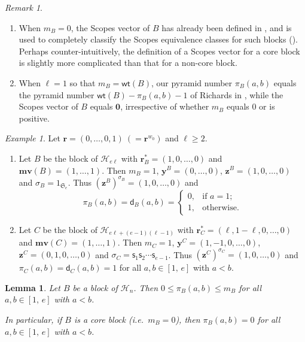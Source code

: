 \documentclass[11pt,a4paper,reqno]{amsart}
\numberwithin{equation}{section}
\theoremstyle{plain}
\newtheorem{lem}[thm]{Lemma}
\theoremstyle{definition}
\theoremstyle{remark}
\newtheorem{rem}[thm]{Remark}
\newtheorem{eg}[thm]{Example}
\numberwithin{equation}{section}
\newcommand{\br}{\mathbf{r}}
\newcommand{\by}{\mathbf{y}}
\newcommand{\bz}{\mathbf{z}}
\newcommand{\wt}{\mathsf{wt}}
\newcommand{\mv}{\mathbf{mv}}
\newcommand{\cs}{\mathsf{s}}
\newcommand{\HH}{\mathcal{H}}
\newcommand{\sym}[1]{\mathfrak{S}_{#1}}
\newcommand{\dd}{\mathsf{d}}
\begin{document}
\begin{rem} \hfill
\begin{enumerate}
\item When $m_B = 0$, the Scopes vector of $B$ has already been defined in \cite[Definition 4.14]{LQT}, and is used to completely classify the Scopes equivalence classes for such blocks (\cite[Theorem 4.24]{LQT}).
Perhaps counter-intuitively, the definition of a Scopes vector for a core block is slightly more complicated than that for a non-core block.

\item When $\ell = 1$ so that $m_B = \wt(B)$, our pyramid number $\pi_B(a,b)$ equals the pyramid number $\wt(B)-\pi_B(a,b)-1$ of Richards in \cite{R}, while the Scopes vector of $B$ equals $\textbf{0}$, irrespective of whether $m_B$ equals 0 or is positive.
\end{enumerate}
\end{rem}

\begin{eg}
Let $\br = (0,\dotsc, 0 , 1)\ (= \br^{w_0})$ and $\ell \geq 2$.
\begin{enumerate}
\item
Let $B$ be the block of $\HH_{e\ell}$ with $\br^*_B = (1,0,\dotsc, 0)$ and $\mv(B) = (1,\dotsc, 1)$.
Then $m_B =1$, $\by^B = (0,\dotsc, 0)$, $\bz^B = (1,0,\dotsc,0)$ and $\sigma_B = 1_{\sym{e}}$.
Thus $(\bz^B)^{\sigma_B} = (1,0,\dotsc, 0)$ and
$$
\pi_B(a,b) = \dd_B(a,b) =
\begin{cases}
0, &\text{if } a = 1; \\
1, &\text{otherwise.}
\end{cases}
$$

\item
Let $C$ be the block of $\HH_{e\ell + (e-1)(\ell-1)}$ with $\br^*_C = (\ell,1-\ell,0,\dotsc, 0)$ and $\mv(C) = (1,\dotsc, 1)$.
Then $m_C = 1$, $\by^C = (1,-1,0,\dotsc,0)$, $\bz^C = (0,1,0,\dotsc,0)$ and $\sigma_C = \cs_1 \cs_2 \dotsm \cs_{e-1}$.
Thus $(\bz^C)^{\sigma_C} = (1,0,\dotsc, 0)$ and $\pi_C(a,b) = \dd_C(a,b) = 1$ for all $a,b \in [1,\,e]$ with $a < b$.
\end{enumerate}
\end{eg}


\begin{lem} \label{L:pyramid-core}
Let $B$ be a block of $\HH_n$.  Then $0 \leq \pi_B(a,b) \leq m_B$ for all $a,b \in [1,\,e]$ with $a < b$.

In particular, if $B$ is a core block (i.e.\ $m_B = 0$), then $\pi_B(a,b) = 0$ for all $a,b \in [1,\,e]$ with $a < b$.
\end{lem}
\end{document}
